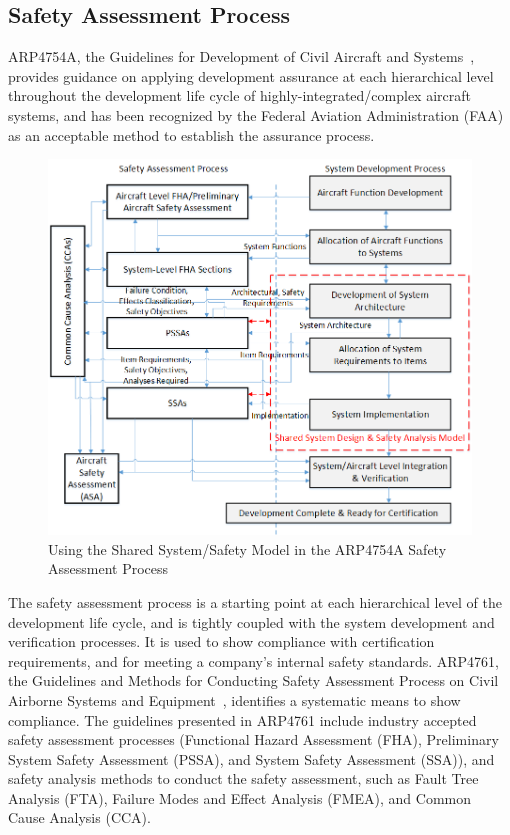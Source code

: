 \subsection{Safety Assessment Process}
\label{subsec:process}

ARP4754A, the Guidelines for Development of Civil Aircraft and Systems~\cite{SAE:ARP4754A}, provides guidance on applying development assurance at each hierarchical level throughout the development life cycle of highly-integrated/complex aircraft systems, and has been recognized by the Federal Aviation Administration (FAA) as an acceptable method to establish the assurance process.

\begin{figure}[h!]
	\centering
	\includegraphics[width=1.0\textwidth]{images/Safety_Assessment_Process.png}
	\caption{Using the Shared System/Safety Model in the ARP4754A Safety Assessment Process}
	\label{fig:proposed_safety_process}
\end{figure}

The safety assessment process is a starting point at each hierarchical level of the development life cycle, and is tightly coupled with the system development and verification processes. It is used to show compliance with certification requirements, and for meeting a company's internal safety standards. ARP4761, the Guidelines and Methods for Conducting Safety Assessment Process on Civil Airborne Systems and Equipment~\cite{SAE:ARP4761},  identifies a systematic means to show compliance. The guidelines presented in ARP4761 include industry accepted safety assessment processes (Functional Hazard Assessment (FHA), Preliminary System Safety Assessment (PSSA), and System Safety Assessment (SSA)), and safety analysis methods to conduct the safety assessment, 
such as Fault Tree Analysis (FTA), Failure Modes and Effect Analysis (FMEA), and Common Cause Analysis (CCA).

